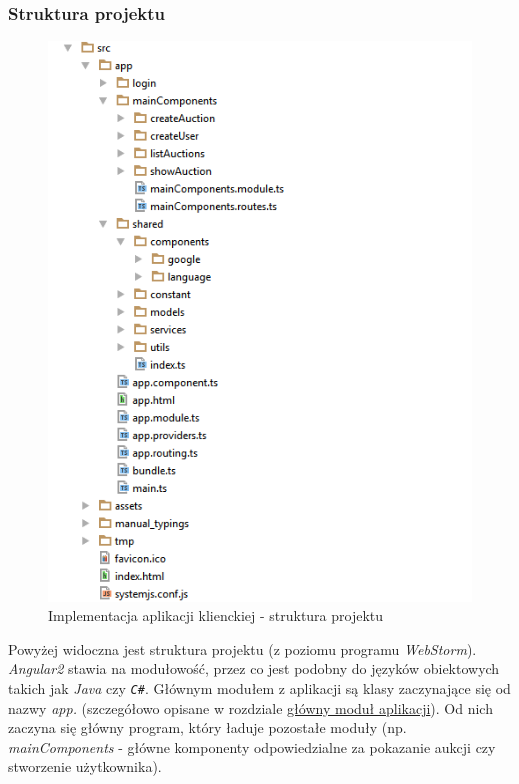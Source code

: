 \documentclass[10pt,titlepage]{article} %
\begin{document}
\subsubsection{Struktura projektu}
\begin{figure}[H]
\centering
\includegraphics[scale=0.75]{img/sekcja3/frontend/strukturaProjektu}
\caption[Implementacja aplikacji klienckiej - struktura projektu]{Implementacja aplikacji klienckiej - struktura projektu}
\end{figure}

Powyżej widoczna jest struktura projektu (z poziomu programu \textit{WebStorm}). \textit{Angular2} stawia na modułowość, przez co jest podobny do języków obiektowych takich jak \textit{Java} czy \textit{\texttt{C\#}}. Głównym modułem z aplikacji są klasy zaczynające się od nazwy \textit{app.} (szczegółowo opisane w rozdziale \hyperref[Glowny modul aplikacji]{główny moduł aplikacji}). Od nich zaczyna się główny program, który ładuje pozostałe moduły (np. \textit{mainComponents} - główne komponenty odpowiedzialne za pokazanie aukcji czy stworzenie użytkownika). 
\end{document}
